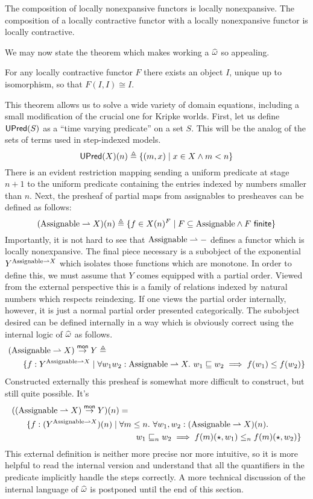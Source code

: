 \begin{lem}
  The composition of locally nonexpansive functors is locally
  nonexpansive. The composition of a locally contractive functor with
  a locally nonexpansive functor is locally contractive.
\end{lem}
We may now state the theorem which makes working a
$\widehat{\omega}$ so appealing.
\begin{thm}\label{thm:steps:fixed-points}
  For any locally contractive functor $F$ there exists an object $I$,
  unique up to isomorphism, so that $F(I, I) \cong I$.
\end{thm}
This theorem allows us to solve a wide variety of domain equations,
including a small modification of the crucial one for Kripke
worlds. First, let us define $\mathsf{UPred}(S)$ as a ``time varying
predicate'' on a set $S$. This will be the analog of the sets of terms
used in step-indexed models.
\[
  \mathsf{UPred}(X)(n) \triangleq \{(m, x) \mid x \in X \land m < n\}
\]
There is an evident restriction mapping sending a uniform predicate at
stage $n + 1$ to the uniform predicate containing the entries indexed
by numbers smaller than $n$. Next, the presheaf of partial maps from
assignables to presheaves can be defined as follows:
\[
  (\assignables \pto X)(n) \triangleq
  \{f \in X(n)^{F} \mid F \subseteq \assignables \land F\ \mathsf{finite}\}
\]
Importantly, it is not hard to see that $\mathrm{Assignable} \rightharpoonup -$ defines
a functor which is locally nonexpansive. The final piece necessary is
a subobject of the exponential $Y^{\mathrm{Assignable} \rightharpoonup X}$ which
isolates those functions which are monotone. In order to define this,
we must assume that $Y$ comes equipped with a partial order. Viewed
from the external perspective this is a family of relations indexed by
natural numbers which respects reindexing. If one views the partial
order internally, however, it is just a normal partial order presented
categorically. The subobject desired can be defined internally in a
way which is obviously correct using the internal logic of
$\widehat{\omega}$ as follows.
\begin{align*}
  (\mathrm{Assignable} \rightharpoonup X) \overset{\mathsf{mon}}{\to} Y &\triangleq \\
  \{f : Y^{\mathrm{Assignable} \rightharpoonup X} \mid{}&
   \forall w_1 w_2 : \mathrm{Assignable} \rightharpoonup X.\ w_1 \mathrel{\sqsubseteq} w_2 \implies f(w_1) \le f(w_2)\}
\end{align*}
Constructed externally this presheaf is somewhat more difficult to
construct, but still quite possible. It's
\begin{align*}
  ((\mathrm{Assignable} \rightharpoonup X) \overset{\mathsf{mon}}{\to} Y)(n) &= \\
  \{f : (Y^{\mathrm{Assignable} \rightharpoonup X})(n) \mid{}&
   \forall m \le n.\ \forall w_1, w_2 : (\mathrm{Assignable} \rightharpoonup X)(n).\\
  &\qquad w_1 \mathrel{\sqsubseteq}_n w_2 \implies f(m)(\star, w_1) \le_n f(m)(\star, w_2)\}
\end{align*}
This external definition is neither more precise nor more intuitive,
so it is more helpful to read the internal version and understand that
all the quantifiers in the predicate implicitly handle the steps
correctly. A more technical discussion of the internal language of
$\widehat{\omega}$ is postponed until the end of this section.

